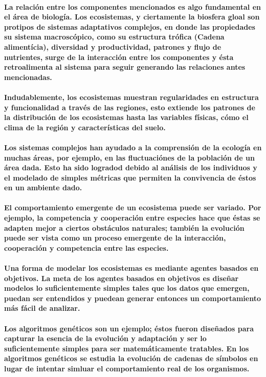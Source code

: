   		\paragraph{La relación entre los componentes mencionados es algo fundamental en el área de biología. Los ecosistemas, y ciertamente la biosfera gloal son protipos de sistemas adaptativos complejos, en donde las propiedades su sistema macroscópico, como su estructura trófica (Cadena alimentícia), diversidad y productividad, patrones y flujo de nutrientes, surge de la interacción entre los componentes y ésta retroalimenta al sistema para seguir generando las relaciones antes mencionadas.}
  		\paragraph{Indudablemente, los ecosistemas muestran regularidades en estructura y funcionalidad a través de las regiones, esto extiende los patrones de la distribución de los ecosistemas hasta las variables físicas, cómo el clima de la región y características del suelo. \cite{7}}
  		\paragraph{Los sistemas complejos han ayudado a la comprensión de la ecología en muchas áreas, por ejemplo, en las fluctuaciónes de la población de un área dada. Esto ha sido logradod debido al análisis de los individuos y el modelado de simples métricas que permiten la convivencia de éstos en un ambiente dado.}  	
  		\paragraph{El comportamiento emergente de un ecosistema puede ser variado. Por ejemplo, la competencia y cooperación entre especies hace que éstas se adapten mejor a ciertos obstáculos naturales; también la evolución puede ser vista como un proceso emergente de la interacción, cooperación y competencia entre las especies.}
  		\paragraph{Una forma de modelar los ecosistemas es mediante agentes basados en objetivos. La meta de los agentes basados en objetivos es diseñar modelos lo suficientemente simples tales que los datos que emergen, puedan ser entendidos y puedean generar entonces un comportamiento más fácil de analizar.}
  		\paragraph{Los algoritmos genéticos son un ejemplo; éstos fueron diseñados para capturar la esencia de la evolución y adaptación y ser lo suficientemente simples para ser matemáticamente tratables. En los algoritmos genéticos se estudia la evolución de cadenas de símbolos en lugar de intentar simluar el comportamiento real de los organismos. \cite{8}}  		